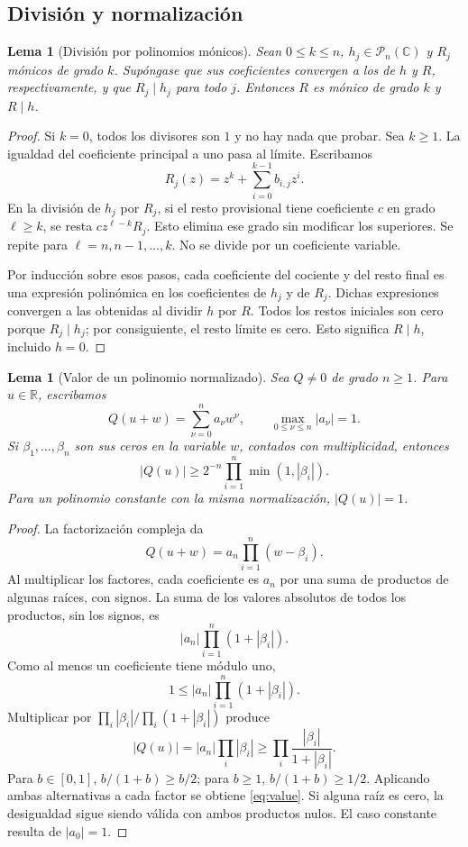 \documentclass[11pt,a4paper]{article}
\numberwithin{equation}{section}
\newtheorem{lemma}[theorem]{Lema}
\theoremstyle{definition}
\theoremstyle{remark}
\newcommand{\R}{\mathbb R}
\newcommand{\C}{\mathbb C}
\newcommand{\PP}{\mathcal P}
\begin{document}
\subsection{División y normalización}
\begin{lemma}[División por polinomios mónicos]\label{lem:division}
Sean $0\le k\le n$, $h_j\in\PP_n(\C)$ y $R_j$ mónicos de grado $k$. Supóngase que sus coeficientes convergen a los de $h$ y $R$, respectivamente, y que $R_j\mid h_j$ para todo $j$. Entonces $R$ es mónico de grado $k$ y $R\mid h$.
\end{lemma}
\begin{proof}
Si $k=0$, todos los divisores son $1$ y no hay nada que probar. Sea $k\ge1$. La igualdad del coeficiente principal a uno pasa al límite. Escribamos
\[
R_j(z)=z^k+\sum_{i=0}^{k-1}b_{i,j}z^i.
\]
En la división de $h_j$ por $R_j$, si el resto provisional tiene coeficiente $c$ en grado $\ell\ge k$, se resta $cz^{\ell-k}R_j$. Esto elimina ese grado sin modificar los superiores. Se repite para $\ell=n,n-1,\ldots,k$. No se divide por un coeficiente variable.

Por inducción sobre esos pasos, cada coeficiente del cociente y del resto final es una expresión polinómica en los coeficientes de $h_j$ y de $R_j$. Dichas expresiones convergen a las obtenidas al dividir $h$ por $R$. Todos los restos iniciales son cero porque $R_j\mid h_j$; por consiguiente, el resto límite es cero. Esto significa $R\mid h$, incluido $h=0$.
\end{proof}

\begin{lemma}[Valor de un polinomio normalizado]\label{lem:value}
Sea $Q\ne0$ de grado $n\ge1$. Para $u\in\R$, escribamos
\[
Q(u+w)=\sum_{\nu=0}^na_\nu w^\nu,\qquad
\max_{0\le\nu\le n}|a_\nu|=1.
\]
Si $\beta_1,\ldots,\beta_n$ son sus ceros en la variable $w$, contados con multiplicidad, entonces
\begin{equation}\label{eq:value}
|Q(u)|\ge 2^{-n}\prod_{i=1}^{n}\min(1,|\beta_i|).
\end{equation}
Para un polinomio constante con la misma normalización, $|Q(u)|=1$.
\end{lemma}
\begin{proof}
La factorización compleja da
\[
Q(u+w)=a_n\prod_{i=1}^n(w-\beta_i).
\]
Al multiplicar los factores, cada coeficiente es $a_n$ por una suma de productos de algunas raíces, con signos. La suma de los valores absolutos de todos los productos, sin los signos, es
\[
|a_n|\prod_{i=1}^n(1+|\beta_i|).
\]
Como al menos un coeficiente tiene módulo uno,
\[
1\le |a_n|\prod_{i=1}^n(1+|\beta_i|).
\]
Multiplicar por $\prod_i|\beta_i|/\prod_i(1+|\beta_i|)$ produce
\[
|Q(u)|=|a_n|\prod_i|\beta_i|
\ge\prod_i\frac{|\beta_i|}{1+|\beta_i|}.
\]
Para $b\in[0,1]$, $b/(1+b)\ge b/2$; para $b\ge1$, $b/(1+b)\ge1/2$. Aplicando ambas alternativas a cada factor se obtiene \eqref{eq:value}. Si alguna raíz es cero, la desigualdad sigue siendo válida con ambos productos nulos. El caso constante resulta de $|a_0|=1$.
\end{proof}
\end{document}

